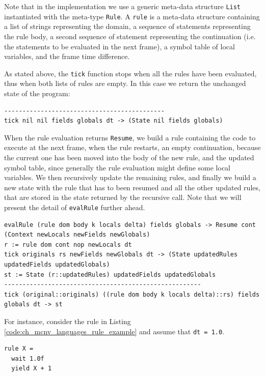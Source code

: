 \noindent
Note that in the implementation we use a generic meta-data structure \texttt{List} instantiated with the meta-type \texttt{Rule}. A \texttt{rule} is a meta-data structure containing a list of strings representing the domain, a sequence of statements representing the rule body, a second sequence of statement representing the continuation (i.e. the statements to be evaluated in the next frame), a symbol table of local variables, and the frame time difference.

As stated above, the \texttt{tick} function stops when all the rules have been evaluated, thus when both lists of rules are empty. In this case we return the unchanged state of the program:\newpage

\begin{lstlisting}
--------------------------------------------
tick nil nil fields globals dt -> (State nil fields globals)
\end{lstlisting}

When the rule evaluation returns \texttt{Resume}, we build a rule containing the code to execute at the next frame, when the rule restarts, an empty continuation, because the current one has been moved into the body of the new rule, and the updated symbol table, since generally the rule evaluation might define some local variables. We then recursively update the remaining rules, and finally we build a new state with the rule that has to been resumed and all the other updated rules, that are stored in the state returned by the recursive call. Note that we will present the detail of \texttt{evalRule} further ahead.

\begin{lstlisting}
evalRule (rule dom body k locals delta) fields globals -> Resume cont (Context newLocals newFields newGlobals)
r := rule dom cont nop newLocals dt
tick originals rs newFields newGlobals dt -> (State updatedRules updatedFields updatedGlobals)
st := State (r::updatedRules) updatedFields updatedGlobals
------------------------------------------------------
tick (original::originals) ((rule dom body k locals delta)::rs) fields globals dt -> st
\end{lstlisting}

\noindent
For instance, consider the rule in Listing \ref{code:ch_mcnv_languages_rule_example} and assume that \texttt{dt = 1.0}.

\begin{lstlisting}[caption = Rule example with interruption, label = code:ch_mcnv_languages_rule_example]
rule X =
  wait 1.0f
  yield X + 1
\end{lstlisting}

